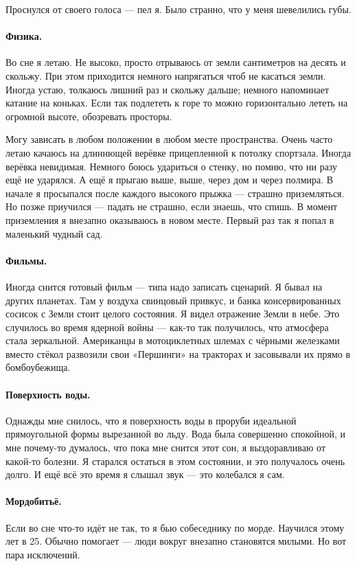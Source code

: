 \documentclass{book}
\begin{document}
Проснулся от своего голоса --- пел я.
Было странно, что у меня шевелились губы.

\paragraph{Физика.}
Во сне я летаю.
Не высоко, просто отрываюсь от земли сантиметров на десять и скольжу.
При этом приходится немного напрягаться чтоб не касаться земли.
Иногда устаю, толкаюсь лишний раз и скольжу дальше; немного напоминает катание на коньках.
Если так подлететь к горе то можно горизонтально лететь на огромной высоте,
обозревать просторы.

Могу зависать в любом положении в любом месте пространства.
Очень часто летаю качаюсь на длиннющей верёвке прицепленной к потолку спортзала.
Иногда верёвка невидимая.
Немного боюсь удариться о стенку, но помню, что ни разу ещё не ударялся.
А ещё я прыгаю выше, выше, через дом и через полмира.
В начале я просыпался после каждого высокого прыжка --- страшно приземляться.
Но позже приучился --- падать не страшно, если знаешь, что спишь.
В момент приземления я внезапно оказываюсь в новом месте.
Первый раз так я попал в маленький чудный сад.

\paragraph{Фильмы.}
Иногда снится готовый фильм --- типа надо записать сценарий.
Я бывал на других планетах.
Там у воздуха свинцовый привкус, и банка консервированных сосисок с Земли стоит целого состояния.
Я видел отражение Земли в небе.
Это случилось во время ядерной войны --- как-то так получилось, что атмосфера стала зеркальной.
Американцы в мотоциклетных шлемах с чёрными железками вместо стёкол развозили свои «Першинги» на тракторах и засовывали их прямо в бомбоубежища.

\paragraph{Поверхность воды.}
Однажды мне снилось, что я поверхность воды в проруби идеальной прямоугольной формы вырезанной во льду.
Вода была совершенно спокойной, и мне почему-то думалось, что пока мне снится этот сон, я выздоравливаю от какой-то болезни.
Я старался остаться в этом состоянии, и это получалось очень долго.
И ещё всё это время я слышал звук --- это колебался я сам.

\paragraph{Мордобитьё.}
Если во сне что-то идёт не так, то я бью собеседнику по морде.
Научился этому лет в 25.
Обычно помогает --- люди вокруг внезапно становятся милыми.
Но вот пара исключений. 
\end{document}

